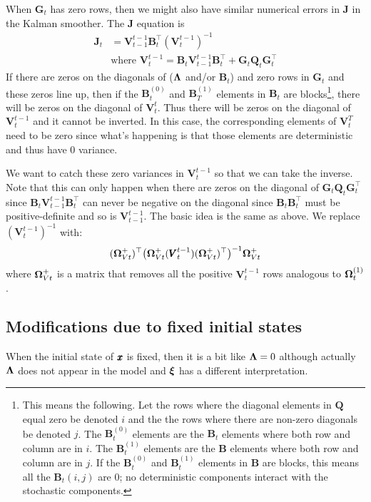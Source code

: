 \documentclass[]{article}
\def\xixi{\mbox{\boldmath $\xi$}}
\def\LAM{\mbox{\boldmath $\Lambda$}}
\def\OMG{\mbox{\boldmath $\Omega$}}
\def\BB{\mbox{$\mathbf B$}}	\def\bb{\mbox{$\mathbf b$}}
\def\GG{\mbox{$\mathbf G$}}	\def\gg{\mbox{$\mathbf g$}}
\def\JJ{\mbox{$\mathbf J$}}
\def\QQ{\mbox{$\mathbf Q$}}	 \def\qq{\mbox{$\mathbf q$}}
\def\VV{\mbox{$\pmb{V}$}}	\def\vv{\mbox{$\pmb{v}$}}
\begin{document}
When $\GG_t$ has zero rows, then we might also have similar numerical errors in $\JJ$ in the Kalman smoother.  The $\JJ$ equation is 
\begin{equation}\label{eq:Jt.2}
\begin{split}
\JJ_t &= \VV_{t-1}^{t-1}\BB_t^\top(\VV_t^{t-1})^{-1}\\
&\text{where }\VV_t^{t-1} = \BB_t \VV_{t-1}^{t-1} \BB_t^\top + \GG_t\QQ_t\GG_t^\top
\end{split}
\end{equation}
If there are zeros on the diagonals of ($\LAM$ and/or $\BB_t$) and zero rows in $\GG_t$ and these zeros line up, then if the $\BB_t^{(0)}$ and $\BB_T^{(1)}$ elements in $\BB_t$ are blocks\footnote{This means the following.  Let the rows where the diagonal elements in $\QQ$ equal zero be denoted $i$ and the the rows where there are non-zero diagonals be denoted $j$. The $\BB_t^{(0)}$ elements are the $\BB_t$ elements where both row and column are in $i$.  The $\BB_t^{(1)}$ elements are the $\BB$ elements where both row and column are in $j$.  If the $\BB_t^{(0)}$ and $\BB_t^{(1)}$ elements in $\BB$ are blocks, this means all the $\BB_t(i,j)$ are 0; no deterministic components interact with the stochastic components.}, there will be zeros on the diagonal of $\VV_t^t$.  Thus there will be zeros on the diagonal of $\VV_t^{t-1}$ and it cannot be inverted.  In this case, the corresponding elements of $\VV_t^T$ need to be zero since what's happening is that those elements are deterministic and thus have 0 variance.

We want to catch these zero variances in $\VV_t^{t-1}$ so that we can take the inverse.  Note that this can only happen when there are zeros on the diagonal of $\GG_t\QQ_t\GG_t^\top$ since $\BB_t\VV_{t-1}^{t-1} \BB_t^\top$ can never be negative on the diagonal since $\BB_t\BB_t^\top$ must be positive-definite and so is $\VV_{t-1}^{t-1}$.  The basic idea is the same as above.  We replace $(\VV_t^{t-1})^{-1}$ with:
\begin{equation}
(\OMG_{Vt}^+)^\top\big(\OMG_{Vt}^+(\VV_t^{t-1})(\OMG_{Vt}^+)^\top\big)^{-1}\OMG_{Vt}^+
\end{equation}
where $\OMG_{Vt}^+$ is a matrix that removes all the positive $\VV_t^{t-1}$ rows analogous to  $\OMG_t^{(1)}$.

\subsection{Modifications due to fixed initial states}
When the initial state of $\mbox{$\pmb{x}$}$ is fixed, then it is a bit like $\LAM=0$ although actually $\LAM$ does not appear in the model and $\xixi$ has a different interpretation.  
\end{document}
